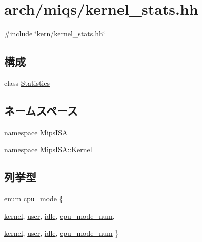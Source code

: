 \hypertarget{arch_2miqs_2kernel__stats_8hh}{
\section{arch/miqs/kernel\_\-stats.hh}
\label{arch_2miqs_2kernel__stats_8hh}
}
{\ttfamily \#include \char`\"{}kern/kernel\_\-stats.hh\char`\"{}}\par
\subsection*{構成}
\begin{DoxyCompactItemize}
\item 
class \hyperlink{classMipsISA_1_1Kernel_1_1Statistics}{Statistics}
\end{DoxyCompactItemize}
\subsection*{ネームスペース}
\begin{DoxyCompactItemize}
\item 
namespace \hyperlink{namespaceMipsISA}{MipsISA}
\item 
namespace \hyperlink{namespaceMipsISA_1_1Kernel}{MipsISA::Kernel}
\end{DoxyCompactItemize}
\subsection*{列挙型}
\begin{DoxyCompactItemize}
\item 
enum \hyperlink{namespaceMipsISA_1_1Kernel_aa1fc3805dac6f71f457fbbc263105bf6}{cpu\_\-mode} \{ \par
\hyperlink{namespaceMipsISA_1_1Kernel_aa1fc3805dac6f71f457fbbc263105bf6a2ff12ba84b360bbe1553c9070a5aa517}{kernel}, 
\hyperlink{namespaceMipsISA_1_1Kernel_aa1fc3805dac6f71f457fbbc263105bf6a5cc32e366c87c4cb49e4309b75f57d64}{user}, 
\hyperlink{namespaceMipsISA_1_1Kernel_aa1fc3805dac6f71f457fbbc263105bf6a657bea711150a583900d447bce32bf23}{idle}, 
\hyperlink{namespaceMipsISA_1_1Kernel_aa1fc3805dac6f71f457fbbc263105bf6aa991579b19b0713f97176b3d761314df}{cpu\_\-mode\_\-num}, 
\par
\hyperlink{namespaceMipsISA_1_1Kernel_aa1fc3805dac6f71f457fbbc263105bf6a2ff12ba84b360bbe1553c9070a5aa517}{kernel}, 
\hyperlink{namespaceMipsISA_1_1Kernel_aa1fc3805dac6f71f457fbbc263105bf6a5cc32e366c87c4cb49e4309b75f57d64}{user}, 
\hyperlink{namespaceMipsISA_1_1Kernel_aa1fc3805dac6f71f457fbbc263105bf6a657bea711150a583900d447bce32bf23}{idle}, 
\hyperlink{namespaceMipsISA_1_1Kernel_aa1fc3805dac6f71f457fbbc263105bf6aa991579b19b0713f97176b3d761314df}{cpu\_\-mode\_\-num}
 \}
\end{DoxyCompactItemize}
